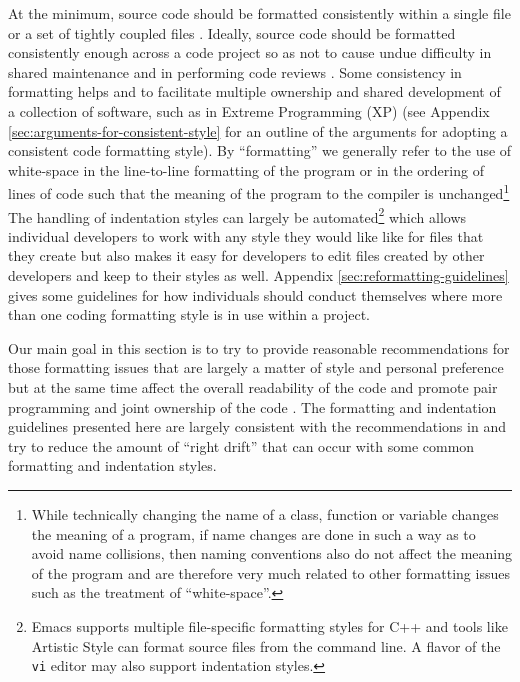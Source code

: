 At the minimum, source code should be formatted consistently within a single
file or a set of tightly coupled files {}\cite[Item 0]{C++CodingStandards05}.
Ideally, source code should be formatted consistently enough across a code
project so as not to cause undue difficulty in shared maintenance and in
performing code reviews {}\cite{CodeComplete2nd04}.  Some consistency in
formatting helps and to facilitate multiple ownership and shared development
of a collection of software, such as in Extreme Programming (XP)
{}\cite{ExtremeProgrammingExplained99} (see Appendix
{}\ref{sec:arguments-for-consistent-style} for an outline of the arguments for
adopting a consistent code formatting style).  By ``formatting'' we generally
refer to the use of white-space in the line-to-line formatting of the program or
in the ordering of lines of code such that the meaning of the program to the
compiler is unchanged\footnote{While technically changing the name of a class,
function or variable changes the meaning of a program, if name changes are
done in such a way as to avoid name collisions, then naming conventions also
do not affect the meaning of the program and are therefore very much related
to other formatting issues such as the treatment of ``white-space''.}  The
handling of indentation styles can largely be automated\footnote{Emacs
supports multiple file-specific formatting styles for C++ and tools like
Artistic Style {}\cite{ArtisticStyle} can format source files from the command
line.  A flavor of the {}\texttt{vi} editor may also support indentation
styles. } which allows individual developers to work with any style they would
like like for files that they create but also makes it easy for developers to
edit files created by other developers and keep to their styles as well.
Appendix {}\ref{sec:reformatting-guidelines} gives some guidelines for how
individuals should conduct themselves where more than one coding formatting
style is in use within a project.

Our main goal in this section is to try to provide reasonable recommendations
for those formatting issues that are largely a matter of style and personal
preference but at the same time affect the overall readability of the code and
promote pair programming and joint ownership of the code
{}\cite{ExtremeProgrammingExplained99}.  The formatting and indentation
guidelines presented here are largely consistent with the recommendations in
{}\cite[Chapter 31]{CodeComplete2nd04} and try to reduce the amount of ``right
drift'' that can occur with some common formatting and indentation styles.

